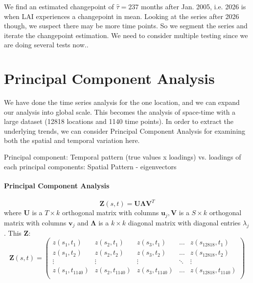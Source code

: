 \documentclass[11pt]{article}
\begin{document}
We find an estimated changepoint of $\hat{\tau}= 237$ months after Jan. 2005, i.e. 2026 is when LAI experiences a changepoint in mean. Looking at the series after 2026 though, we suspect there may be more time points. So we segment the series and iterate the changepoint estimation. We need to consider multiple testing since we are doing several tests now..



\section{Principal Component Analysis}
\paragraph{} 
We have done the time series analysis for the one location, and we can expand our analysis into global scale. This becomes the analysis of space-time with a large dataset (12818 locations and 1140 time points). In order to extract the underlying trends, we can consider Principal Component Analysis for examining both the spatial and temporal variation here. 

Principal component: Temporal pattern (true values x loadings) vs. loadings of each principal components: Spatial Pattern - eigenvectors
\paragraph{Principal Component Analysis}
\begin{equation}
\mathbf{Z}(s,t) = \mathbf{U}\mathbf{\Lambda}\mathbf{V}^T
\end{equation}
where $\mathbf{U}$ is a $T \times k$ orthogonal matrix with columns $\mathbf{u}_j, \mathbf{V}$ is a $S \times k$ orthogonal matrix with columns $\mathbf{v}_j$ and $\mathbf{\Lambda}$ is a $k \times k$ diagonal matrix with diagonal entries $\lambda_j$. This $\mathbf{Z}$: 
\begin{equation}
\mathbf{Z}(s,t)  = \begin{pmatrix}
z(s_1, t_1) & z(s_2, t_1) & z(s_3, t_1) & \dots & z(s_{12818}, t_1) \\
z(s_1, t_2) & z(s_2, t_2) & z(s_3, t_2) & \dots & z(s_{12818}, t_2) \\
\vdots & \vdots & \vdots & \ddots & \vdots\\
z(s_1, t_{1140}) & z(s_2, t_{1140}) & z(s_3, t_{1140}) & \dots & z(s_{12818}, t_{1140})\\ 
\end{pmatrix}
\end{equation}
\end{document}
